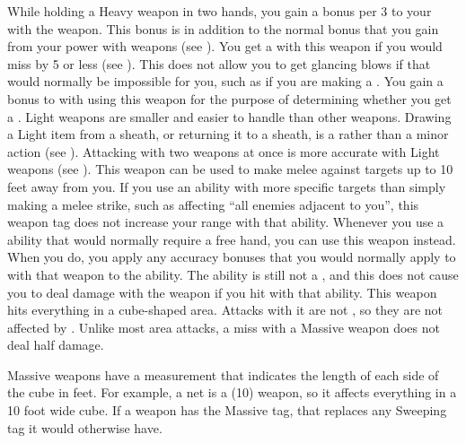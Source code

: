     While holding a Heavy weapon in two hands, you gain a  bonus per 3  to your  with the weapon.
    This bonus is in addition to the normal bonus that you gain from your power with weapons (see ).
     You get a  with this weapon if you would miss by 5 or less (see ).
    This does not allow you to get glancing blows if that would normally be impossible for you, such as if you are making a .
     You gain a  bonus to  with  using this weapon for the purpose of determining whether you get a .
     Light weapons are smaller and easier to handle than other weapons.
    Drawing a Light item from a sheath, or returning it to a sheath, is a  rather than a minor action (see ).
    Attacking with two weapons at once is more accurate with Light weapons (see ).
    \label{Long Weapon} This weapon can be used to make melee  against targets up to 10 feet away from you.
    If you use an ability with more specific targets than simply making a melee strike, such as affecting ``all enemies adjacent to you'', this weapon tag does not increase your range with that ability.
     Whenever you use a \atBrawling ability that would normally require a free hand, you can use this weapon instead.
    When you do, you apply any accuracy bonuses that you would normally apply to  with that weapon to the ability.
    The ability is still not a , and this does not cause you to deal damage with the weapon if you hit with that ability.
     This weapon hits everything in a cube-shaped area.
    Attacks with it are not , so they are not affected by .
    Unlike most area attacks, a miss with a Massive weapon does not deal half damage.

    Massive weapons have a measurement that indicates the length of each side of the cube in feet.
    For example, a net is a  (10) weapon, so it affects everything in a 10 foot wide cube.
    If a weapon has the Massive tag, that replaces any Sweeping tag it would otherwise have.

